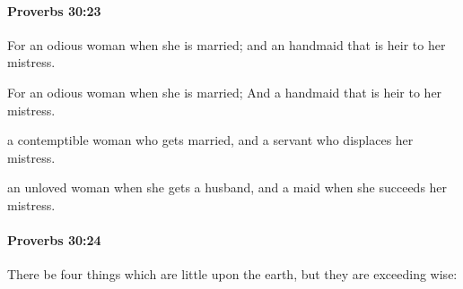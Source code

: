 		\paragraph{Proverbs 30:23} %
			\label{PROVERBS-30-23}

			For an odious woman when she is married; and an handmaid that is heir to her mistress.

			\begin{versebox}
					\item[BHS] 
					\item[ASV] For an odious woman when she is married; And a handmaid that is heir to her mistress.
					\item[NIV] a contemptible woman who gets married, and a servant who displaces her mistress.
					\item[NRSV] an unloved woman when she gets a husband, and a maid when she succeeds her mistress.
			\end{versebox}

		\paragraph{Proverbs 30:24} %
			\label{PROVERBS-30-24}

			There be four things which are little upon the earth, but they are exceeding wise:

